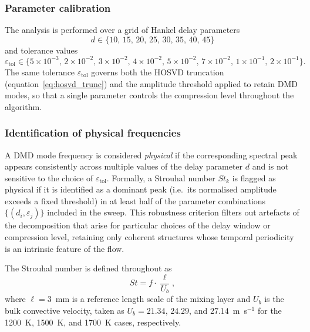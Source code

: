 \subsubsection*{Parameter calibration}

The analysis is performed over a grid of Hankel delay parameters
\begin{equation}
    d \in \{10,\, 15,\, 20,\, 25,\, 30,\, 35,\, 40,\, 45\}
    \label{eq:d_values}
\end{equation}
and tolerance values
\begin{equation}
    \varepsilon_{\mathrm{tol}} \in
    \{5\times10^{-3},\, 2\times10^{-2},\, 3\times10^{-2},\, 4\times10^{-2},\,
      5\times10^{-2},\, 7\times10^{-2},\, 1\times10^{-1},\, 2\times10^{-1}\}.
    \label{eq:tol_values}
\end{equation}
The same tolerance $\varepsilon_{\mathrm{tol}}$ governs both the HOSVD truncation
(equation~\eqref{eq:hosvd_trunc}) and the amplitude threshold applied to retain DMD
modes, so that a single parameter controls the compression level throughout the
algorithm.

\subsubsection*{Identification of physical frequencies}

A DMD mode frequency is considered \emph{physical} if the corresponding spectral peak
appears consistently across multiple values of the delay parameter $d$ and is not
sensitive to the choice of $\varepsilon_{\mathrm{tol}}$.
Formally, a Strouhal number $St_k$ is flagged as physical if it is identified as a
dominant peak (i.e.\ its normalised amplitude exceeds a fixed threshold) in at least
half of the parameter combinations $\{(d_i, \varepsilon_j)\}$ included in the sweep.
This robustness criterion filters out artefacts of the decomposition that arise for
particular choices of the delay window or compression level, retaining only coherent
structures whose temporal periodicity is an intrinsic feature of the flow.

The Strouhal number is defined throughout as
\begin{equation}
    St = f \cdot \frac{\ell}{U_b},
    \label{eq:strouhal}
\end{equation}
where $\ell = 3$~mm is a reference length scale of the mixing layer and $U_b$ is the
bulk convective velocity, taken as $U_b = 21.34$, $24.29$, and $27.14$~m~s$^{-1}$ for
the 1200~K, 1500~K, and 1700~K cases, respectively.


